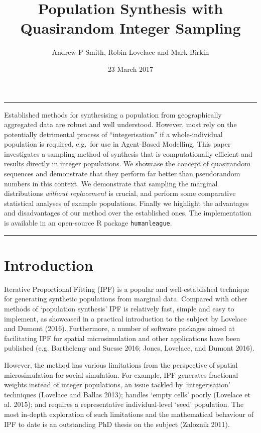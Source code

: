 \documentclass[]{article}
\title{Population Synthesis with Quasirandom Integer Sampling}
\author{Andrew P Smith, Robin Lovelace and Mark Birkin}
\date{23 March 2017}
\begin{document}
\maketitle

\begin{center}\rule{0.5\linewidth}{\linethickness}\end{center}

Established methods for synthesising a population from geographically
aggregated data are robust and well understood. However, most rely on
the potentially detrimental process of ``integerisation'' if a
whole-individual population is required, e.g.~for use in Agent-Based
Modelling. This paper investigates a sampling method of synthesis that
is computationally efficient and results directly in integer
populations. We showcase the concept of quasirandom sequences and
demonstrate that they perform far better than pseudorandom numbers in
this context. We demonstrate that sampling the marginal distributions
\emph{without replacement} is crucial, and perform some comparative
statistical analyses of example populations. Finally we highlight the
advantages and disadvantages of our method over the established ones.
The implementation is available in an open-source R package
\texttt{humanleague}.

\begin{center}\rule{0.5\linewidth}{\linethickness}\end{center}

\section{Introduction}\label{introduction}

Iterative Proportional Fitting (IPF) is a popular and well-established
technique for generating synthetic populations from marginal data.
Compared with other methods of `population synthesis' IPF is relatively
fast, simple and easy to implement, as showcased in a practical
introduction to the subject by Lovelace and Dumont (2016). Furthermore,
a number of software packages aimed at facilitating IPF for spatial
microsimulation and other applications have been published (e.g.
Barthelemy and Suesse 2016; Jones, Lovelace, and Dumont 2016).

However, the method has various limitations from the perspective of
spatial microsimulation for social simulation. For example, IPF
generates fractional weights instead of integer populations, an issue
tackled by `integerisation' techniques (Lovelace and Ballas 2013);
handles `empty cells' poorly (Lovelace et al. 2015); and requires a
representative individual-level `seed' population. The most in-depth
exploration of such limitations and the mathematical behaviour of IPF to
date is an outstanding PhD thesis on the subject (Zaloznik 2011).
\end{document}

